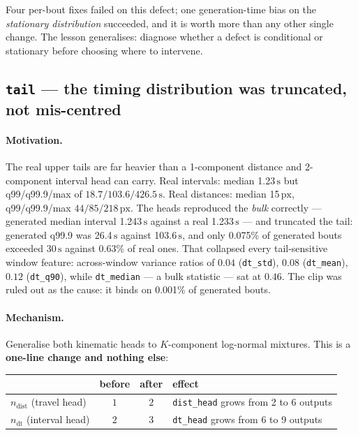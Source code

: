 \documentclass[11pt,a4paper]{article}
\newcommand{\uu}[1]{\ensuremath{\,\mathrm{#1}}}  %
\newcommand{\code}[1]{\texttt{\small #1}}
\begin{document}
\begin{takeaway}
Four per-bout fixes failed on this defect; one generation-time bias on the
\emph{stationary distribution} succeeded, and it is worth more than any other single
change. The lesson generalises: diagnose whether a defect is conditional or stationary
before choosing where to intervene.
\end{takeaway}

\subsection{\texttt{tail} --- the timing distribution was truncated, not mis-centred}

\paragraph{Motivation.}
The real upper tails are far heavier than a 1-component distance and 2-component interval
head can carry. Real intervals: median 1.23\uu{s} but q99/q99.9/max of
$18.7/103.6/426.5\uu{s}$. Real distances: median 15\uu{px}, q99/q99.9/max
$44/85/218\uu{px}$. The heads reproduced the \emph{bulk} correctly --- generated median
interval 1.243\uu{s} against a real 1.233\uu{s} --- and truncated the tail:
generated q99.9 was 26.4\uu{s} against 103.6\uu{s}, and only 0.075\% of
generated bouts exceeded 30\uu{s} against 0.63\% of real ones. That collapsed
every tail-sensitive window feature: across-window variance ratios of $0.04$
(\code{dt\_std}), $0.08$ (\code{dt\_mean}), $0.12$ (\code{dt\_q90}), while
\code{dt\_median} --- a bulk statistic --- sat at $0.46$. The clip was ruled out as the
cause: it binds on 0.001\% of generated bouts.

\paragraph{Mechanism.}
Generalise both kinematic heads to $K$-component log-normal mixtures. This is a
\textbf{one-line change and nothing else}:

\begin{center}\small
\begin{tabular}{@{}lccp{}@{}}
\toprule
& \textbf{before} & \textbf{after} & \textbf{effect} \\
\midrule
$n_{\mathrm{dist}}$ (travel head)   & $1$ & $2$ & \code{dist\_head} grows from 2 to 6 outputs \\
$n_{\mathrm{dt}}$ (interval head)   & $2$ & $3$ & \code{dt\_head} grows from 6 to 9 outputs \\
\bottomrule
\end{tabular}
\end{center}
\end{document}
